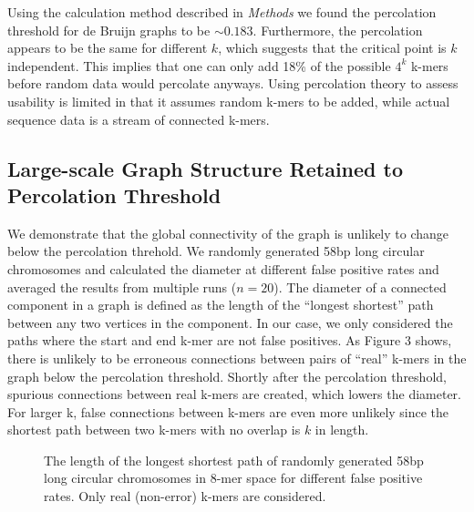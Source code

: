 \documentclass[12pt]{article} \usepackage{simplemargins}
\begin{document}
Using the calculation method described in \emph{Methods} we found the 
percolation threshold for de Bruijn graphs to be $\sim0.183$. 
Furthermore, the percolation appears to be the same for 
different $k$, which suggests that the 
critical point is $k$ independent.
This implies that one can only add 18\% of the possible $4^k$ k-mers
before random data would percolate anyways. Using percolation theory to 
assess usability is limited in that it assumes
random k-mers to be added, while actual sequence data is a stream of
connected k-mers.

\subsection{Large-scale Graph Structure Retained to Percolation Threshold}
We demonstrate that the global connectivity of the graph is unlikely 
to change below the percolation threhold. We randomly generated 58bp long circular 
chromosomes and calculated the diameter at different false positive rates and averaged 
the results from multiple runs ($n=20$). The diameter 
of a connected component in a graph is defined as the length of the ``longest shortest'' 
path between any two vertices in the component. In our case, we only considered the 
paths where the start and end k-mer are not false positives. As Figure 3 shows, 
there is unlikely to 
be erroneous connections between pairs of ``real'' k-mers in the graph below the 
percolation threshold. Shortly after the percolation threshold, spurious connections 
between real k-mers are created, which lowers the diameter. For larger k, false connections 
between k-mers are even more unlikely since the shortest path between two k-mers 
with no overlap is $k$ in length.

\begin{figure}
\caption{The length of the longest shortest path of randomly generated 58bp 
long circular chromosomes in 8-mer 
space for different false positive rates. Only real (non-error) k-mers are 
considered.}
\end{figure}
\end{document}
